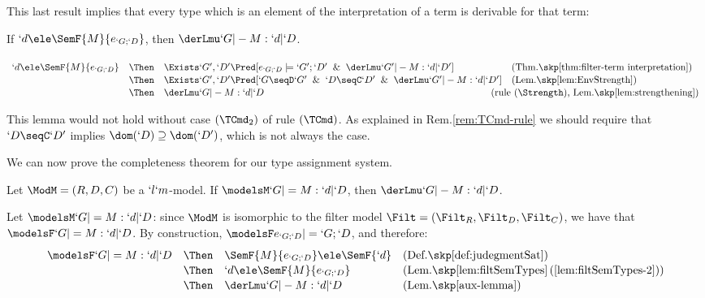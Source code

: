 \documentclass{CSML}
\begin{document}
This last result implies that every type which is an element of the interpretation of a term is derivable for that term:

 \begin{lem} \label{aux-lemma}
If $ `d \ele \SemF { M }{e_{`G;`D }} $, then $ \derLmu `G |- M : `d | `D $.
 \end{lem}
\proof%
$ \def \arraystretch{1.1} \begin{array}[t]{lcll}
`d \ele \SemF { M }{ e_{`G;`D } } 
	& \Then & 
 \Exists`G',`D' \Pred [ e_{`G;`D } \models `G';`D' \And \derLmu `G' |- M : `d | `D' ] 
	& (\textrm{Thm.\skp\ref{thm:filter-term interpretation}}) \\
	& \Then & 
 \Exists`G',`D' \Pred [ `G\seqD `G' \And `D\seqC `D' \And \derLmu `G' |- M : `d | `D' ] 
	& (\textrm{Lem.\skp\ref{lem:EnvStrength}}) \\
	& \Then & 
 \derLmu `G |- M : `d | `D 
	& \kern-7.5mm (\textrm{rule $(\Strength)$, Lem.\skp\ref{lem:strengthening}}) %
 \end{array} $
 \arrayqed

\noindent This lemma would not hold without case $(\TCmd_2)$ of rule $(\TCmd)$. As explained in Rem.\skp\ref{rem:TCmd-rule} we should require that $`D\seqC `D'$ implies $\dom(`D) \supseteq \dom(`D')$, which is not always the case.

We can now prove the completeness theorem for our type assignment system.

 \begin{thm}[Completeness] \label{thm:typeAssCompl}
Let ${\ModM} = (R,D,C)$ be a $`l`m$-model. If $ \modelsM `G |= M : `d | `D $, then $ \derLmu `G |- M : `d | `D $.
 \end{thm}
	
\proof%
Let $ \modelsM `G |= M : `d | `D $: since ${\ModM}$ is isomorphic to the filter model $\Filt = (\Filt_R,\Filt_D,\Filt_C)$,
we have that $\modelsF `G |= M : `d | `D $. By construction, $\modelsF e_{`G;`D } |= `G;`D $, and therefore:
%
 \[ \def \arraystretch{1.1} \begin{array}{lcll}
 \modelsF `G |= M : `d | `D 
	& \Then & 
 \SemF { M }{ e_{`G;`D } } \ele \SemF {`d} & (\textrm{Def.\skp\ref{def:judegmentSat}}) \\
	& \Then & 
`d \ele \SemF { M }{ e_{`G;`D } } & (\textrm{Lem.\skp\ref{lem:filtSemTypes}\,(\ref{lem:filtSemTypes-2})}) \\
	& \Then &
 \derLmu `G |- M : `d | `D & 
	(\textrm{Lem.\skp\ref{aux-lemma}}) 
 \end{array} \]
\arrayqed[-22pt]
\end{document}
